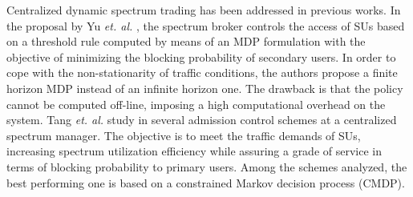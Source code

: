%
%
%
%
%

Centralized dynamic spectrum trading has been addressed in previous works. In the proposal by Yu \textit{et. al.} \cite{ref:Yu2007}, the spectrum broker controls the access of SUs based on a threshold rule computed by means of an MDP formulation with the objective of minimizing the blocking probability of secondary users. In order to cope with the non-stationarity of traffic conditions, the authors propose a finite horizon MDP instead of an infinite horizon one. The drawback is that the policy cannot be computed off-line, imposing a high computational overhead on the system.
Tang \textit{et. al.} study in \cite{ref:Tang2009_per} several admission control schemes at a centralized spectrum manager. The objective is to meet the traffic demands of SUs, increasing spectrum utilization efficiency while assuring a grade of service in terms of blocking probability to primary users. Among the schemes analyzed, the best performing one is based on a constrained Markov decision process (CMDP).

